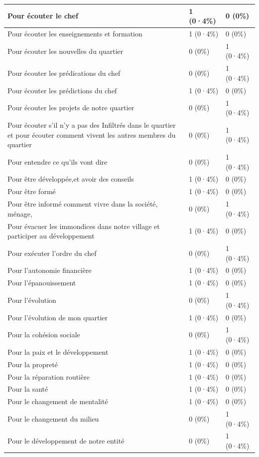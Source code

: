 \documentclass[
]{book}
\begin{document}
\begin{tabular}{l|l|l}
\hline
Pour écouter le chef & 1 (0·4\%) & 0 (0\%)\\
\hline
Pour écouter les enseignements et formation & 1 (0·4\%) & 0 (0\%)\\
\hline
Pour écouter les nouvelles du quartier & 0 (0\%) & 1 (0·4\%)\\
\hline
Pour écouter les prédications du chef & 0 (0\%) & 1 (0·4\%)\\
\hline
Pour écouter les prédictions du chef & 1 (0·4\%) & 0 (0\%)\\
\hline
Pour écouter les projets de notre quartier & 0 (0\%) & 1 (0·4\%)\\
\hline
Pour écouter s'il n'y a pas des Infiltrés dans le quartier et pour écouter comment  vivent les autres membres du quartier & 0 (0\%) & 1 (0·4\%)\\
\hline
Pour entendre ce qu'ils vont dire & 0 (0\%) & 1 (0·4\%)\\
\hline
Pour être développée,et avoir des conseils & 1 (0·4\%) & 0 (0\%)\\
\hline
Pour être formé & 1 (0·4\%) & 0 (0\%)\\
\hline
Pour être informé comment vivre dans la société, ménage, & 0 (0\%) & 1 (0·4\%)\\
\hline
Pour évacuer les immondices dans notre village et participer au développement & 1 (0·4\%) & 0 (0\%)\\
\hline
Pour exécuter l'ordre du chef & 0 (0\%) & 1 (0·4\%)\\
\hline
Pour l'autonomie financière & 1 (0·4\%) & 0 (0\%)\\
\hline
Pour l'épanouissement & 1 (0·4\%) & 0 (0\%)\\
\hline
Pour l'évolution & 0 (0\%) & 1 (0·4\%)\\
\hline
Pour l'évolution de mon quartier & 1 (0·4\%) & 0 (0\%)\\
\hline
Pour la cohésion sociale & 0 (0\%) & 1 (0·4\%)\\
\hline
Pour la paix et le développement & 1 (0·4\%) & 0 (0\%)\\
\hline
Pour la propreté & 1 (0·4\%) & 0 (0\%)\\
\hline
Pour la réparation routière & 1 (0·4\%) & 0 (0\%)\\
\hline
Pour la santé & 1 (0·4\%) & 0 (0\%)\\
\hline
Pour le changement de mentalité & 1 (0·4\%) & 0 (0\%)\\
\hline
Pour le changement du milieu & 0 (0\%) & 1 (0·4\%)\\
\hline
Pour le développement de notre entité & 0 (0\%) & 1 (0·4\%)\\

\end{tabular}
\end{document}
